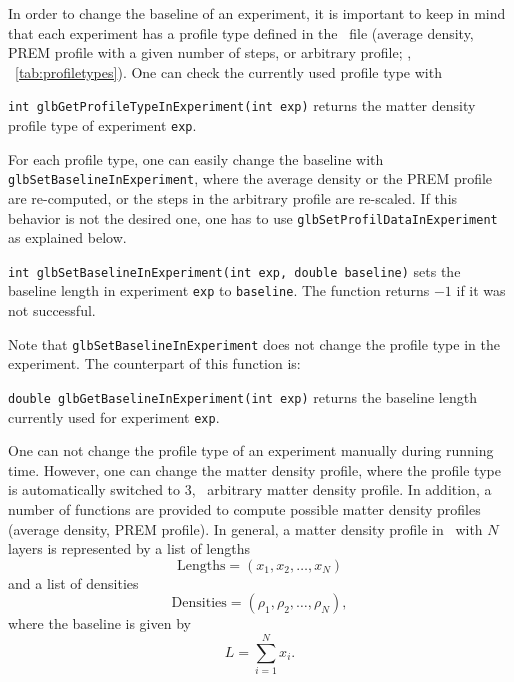 In order to change the baseline of an experiment, it is important
to keep in mind that each experiment has a profile type defined
in the \AEDL\ file (average density, PREM profile with a given
number of steps, or arbitrary profile; \cf, \Tab~\ref{tab:profiletypes}). One can check the currently
used profile type with
\begin{function}
{\tt int glbGetProfileTypeInExperiment(int exp)} returns the matter density profile
type of experiment {\tt exp}.
\end{function}
For each profile type, one can easily change the baseline with {\tt glbSetBaselineInExperiment},
where the average density or the PREM profile are re-computed, or the
steps in the arbitrary profile are re-scaled. If this behavior is 
not the desired one, one has to use {\tt glbSetProfilDataInExperiment}
as explained below.
\begin{function}
{\tt int glbSetBaselineInExperiment(int exp, double baseline)}
sets the baseline length in experiment {\tt exp} to {\tt baseline}.
The function returns $-1$ if it was not successful.
\end{function}
Note that {\tt glbSetBaselineInExperiment} does not change the
profile type in the experiment. The counterpart of this function is:
\begin{function}
{\tt double glbGetBaselineInExperiment(int exp)} returns the
baseline length currently used for experiment {\tt exp}.
\end{function}
One can not change the profile type of an experiment manually
during running time. However, one can change the matter density
profile, where the profile type is automatically switched to 3, \ie\ 
arbitrary matter density profile. In addition, a number of functions 
are provided to compute possible matter density profiles (average density,
PREM profile). In general, a matter density profile in \GLOBES\ with
$N$ layers is represented by a list of lengths 
\begin{equation}
\mathrm{Lengths} = (x_1,x_2, \hdots, x_N) 
\end{equation}
and a list of densities
\begin{equation}
\mathrm{Densities} = (\rho_1,\rho_2, \hdots, \rho_N), 
\end{equation}
where the baseline is given by
\begin{equation}
L = \sum\limits_{i=1}^N x_i.
\end{equation}
